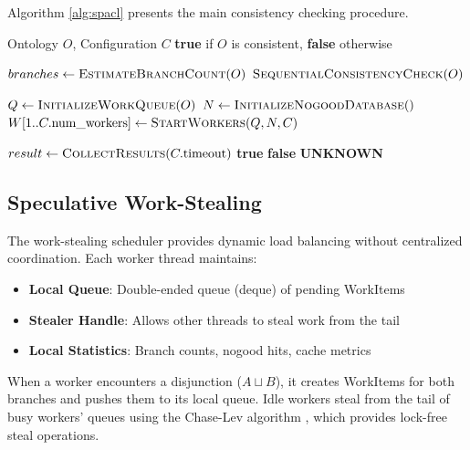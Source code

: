 \documentclass[preprint,12pt]{elsarticle}
\begin{document}
Algorithm \ref{alg:spacl} presents the main consistency checking procedure.

\begin{algorithm}[htbp]
\caption{SPACL Consistency Check}
\label{alg:spacl}
\begin{algorithmic}[1]
\Require Ontology $O$, Configuration $C$
\Ensure \textbf{true} if $O$ is consistent, \textbf{false} otherwise

\State $branches \gets \textsc{EstimateBranchCount}(O)$
 \label{line:threshold}
    \State \Return $\textsc{SequentialConsistencyCheck}(O)$ \label{line:sequential}
\EndIf

\State $Q \gets \textsc{InitializeWorkQueue}(O)$ \label{line:init}
\State $N \gets \textsc{InitializeNogoodDatabase}()$
\State $W[1..C.\text{num\_workers}] \gets \textsc{StartWorkers}(Q, N, C)$

    \State $result \gets \textsc{CollectResults}(C.\text{timeout})$
     \Return \textbf{true}
     \Return \textbf{false}
     \Return \textbf{UNKNOWN}
    \EndIf
\EndWhile
\end{algorithmic}
\end{algorithm}

\subsection{Speculative Work-Stealing}
\label{sec:workstealing}

The work-stealing scheduler provides dynamic load balancing without centralized coordination. Each worker thread maintains:

\begin{itemize}
    \item \textbf{Local Queue}: Double-ended queue (deque) of pending WorkItems
    \item \textbf{Stealer Handle}: Allows other threads to steal work from the tail
    \item \textbf{Local Statistics}: Branch counts, nogood hits, cache metrics
\end{itemize}

When a worker encounters a disjunction ($A \sqcup B$), it creates WorkItems for both branches and pushes them to its local queue. Idle workers steal from the tail of busy workers' queues using the Chase-Lev algorithm \cite{workstealing}, which provides lock-free steal operations.
\end{document}
